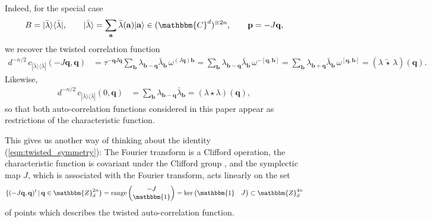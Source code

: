 \documentclass[aps,nofootinbib,floatfix,a4paper]{revtex4}
\newcommand{\1}{\mbox{$\mathbf{1}$}}
\def\ZZ{\mathbbm{Z}}
\def\CC{\mathbbm{C}}
\def\Id{\mathbbm{1}}
\DeclareMathOperator{\range}{range}
\newcommand{\twisted}{\,\tilde\star\,}
\renewcommand{\vec}{\mathbf}
\begin{document}
%
Indeed, for the special case 
\begin{align*}
	B=|\bar\lambda\rangle\langle\bar\lambda|, \qquad
	|\bar\lambda\rangle = \sum_{\vec a} \bar\lambda(\vec a)|\vec a\rangle \in (\CC^d)^{\otimes 2n},
	\qquad
	\vec p = -J \vec q,
\end{align*}
we recover the twisted correlation function
\begin{align*}
	d^{-n/2}\,
	c_{|\bar\lambda\rangle\langle\bar\lambda|}(-J \vec q, \vec q)
	&=
	\tau^{-\vec q J \vec q}
	\sum_{\vec b}
		\lambda_{\vec b - \vec q}
		\bar\lambda_{\vec b}
		\,
		\omega^{(J\vec q) \vec b}
	=
	\sum_{\vec b}
		\lambda_{\vec b - \vec q}
		\bar\lambda_{\vec b}
		\,
		\omega^{-[\vec q, \vec b]}
	=
	\sum_{\vec b}
		\lambda_{\vec b + \vec q}
		\bar\lambda_{\vec b}
		\,
		\omega^{[\vec q, \vec b]}
	=
	(\lambda\twisted\lambda)(\vec q).
\end{align*}
Likewise,
\begin{align*}
	d^{-n/2}\,
	c_{|\bar\lambda\rangle\langle\bar\lambda|}(0, \vec q)
	&=
	\sum_{\vec b}
		\lambda_{\vec b - \vec q}
		\bar\lambda_{\vec b}
	=
	(\lambda\star\lambda)(\vec q),
\end{align*}
so that both auto-correlation functions considered in this paper appear as restrictions of the characteristic function.

This gives us another way of thinking about the identity (\ref{eqn:twisted_symmetry}):
The Fourier transform is a Clifford operation,
the characteristic function is covariant under the Clifford group \cite{gross2006hudson, gross2021schur},
and the symplectic map $J$, which is associated with the Fourier transform,
acts linearly on the set
\begin{align}\label{eqn:twisted_char}
	\{ (-J \vec q, \vec q)^t \,|\, \vec q \in \ZZ_d^{2n}\}
	=
	\range
	\begin{pmatrix}
		-J \\
		\Id
	\end{pmatrix}
	=
	\ker 
	\begin{pmatrix}
		\Id & J
	\end{pmatrix}
	\subset \ZZ_d^{4n}
\end{align}
of points which describes the twisted auto-correlation function.
\end{document}
